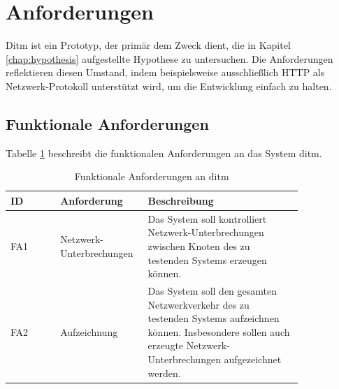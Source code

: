 \documentclass[12pt,a4paper]{report}
\begin{document}
\section{Anforderungen}
Ditm ist ein Prototyp, der primär dem Zweck dient, die in Kapitel \ref{chap:hypothesis} aufgestellte Hypothese zu untersuchen.
Die Anforderungen reflektieren diesen Umstand, indem beispielsweise ausschließlich HTTP als Netzwerk-Protokoll unterstützt wird,
um die Entwicklung einfach zu halten.

\subsection{Funktionale Anforderungen}
Tabelle \ref{tab:fa} beschreibt die funktionalen Anforderungen an das System ditm.
\begin{longtable}[H]{|p{}|p{0.3\linewidth}|p{0.53\linewidth}|}
	\caption{Funktionale Anforderungen an ditm\label{tab:fa}}                                                                                                                                                                                                                                                                                                                                                                                        \\
	\hline
	ID   & Anforderung                   & Beschreibung                                                                                                                                                                                                                                                                                                                                                                                              \\ \hline
	FA1  & Netzwerk-Unterbrechungen      & Das System soll kontrolliert Netzwerk-Unterbrechungen zwischen Knoten des zu testenden Systems erzeugen können.                                                                                                                                                                                                                                                                                           \\ \hline
	FA2  & Aufzeichnung                  & Das System soll den gesamten Netzwerkverkehr des zu testenden Systems aufzeichnen können. Insbesondere sollen auch erzeugte Netzwerk-Unterbrechungen aufgezeichnet werden.                                                                                                                                                                                                                                \\ \hline

\end{longtable}
\end{document}
